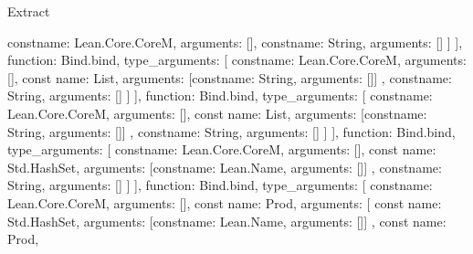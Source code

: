 \begin{lexlean}{Extract}
\begin{toolingmodule}
{{{{{{{{{{{{{{{                                              const{name: Lean.Core.CoreM, arguments: []},
                                              const{name: String, arguments: []}
                                            ]
                                          }
                                        }
                                      ],
                                      function: Bind.bind,
                                      type_arguments: [
                                        const{name: Lean.Core.CoreM, arguments: []},
                                        const{
                                          name: List,
                                          arguments: [const{name: String, arguments: []}]
                                        },
                                        const{name: String, arguments: []}
                                      ]
                                    }
                                  }
                                ],
                                function: Bind.bind,
                                type_arguments: [
                                  const{name: Lean.Core.CoreM, arguments: []},
                                  const{
                                    name: List,
                                    arguments: [const{name: String, arguments: []}]
                                  },
                                  const{name: String, arguments: []}
                                ]
                              }
                            }
                          ],
                          function: Bind.bind,
                          type_arguments: [
                            const{name: Lean.Core.CoreM, arguments: []},
                            const{
                              name: Std.HashSet,
                              arguments: [const{name: Lean.Name, arguments: []}]
                            },
                            const{name: String, arguments: []}
                          ]
                        }
                      }
                    ],
                    function: Bind.bind,
                    type_arguments: [
                      const{name: Lean.Core.CoreM, arguments: []},
                      const{
                        name: Prod,
                        arguments: [
                          const{
                            name: Std.HashSet,
                            arguments: [const{name: Lean.Name, arguments: []}]
                          },
                          const{
                            name: Prod,
}}}}}}}}}
\end{toolingmodule}
\end{lexlean}
